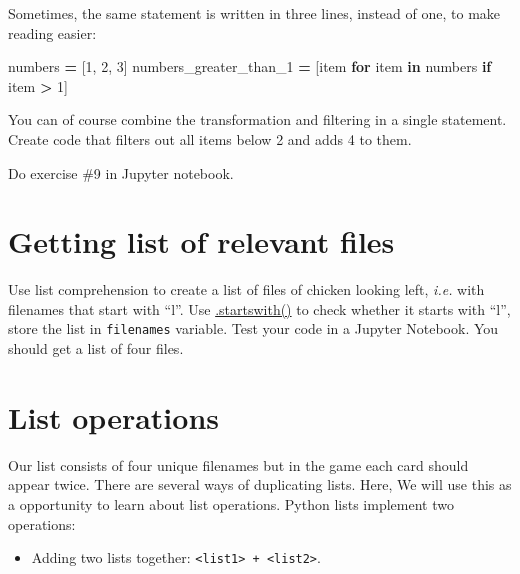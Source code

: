 \documentclass[
]{book}
\newenvironment{Shaded}{\begin{snugshade}}{\end{snugshade}}
\newcommand{\ControlFlowTok}[1]{\textcolor[rgb]{0.13,0.29,0.53}{\textbf{#1}}}
\newcommand{\DecValTok}[1]{\textcolor[rgb]{0.00,0.00,0.81}{#1}}
\newcommand{\KeywordTok}[1]{\textcolor[rgb]{0.13,0.29,0.53}{\textbf{#1}}}
\newcommand{\NormalTok}[1]{#1}
\newcommand{\OperatorTok}[1]{\textcolor[rgb]{0.81,0.36,0.00}{\textbf{#1}}}
\providecommand{\tightlist}{%
  \setlength{\itemsep}{0pt}\setlength{\parskip}{0pt}}
\begin{document}
Sometimes, the same statement is written in three lines, instead of one, to make reading easier:

\begin{Shaded}
\begin{Highlighting}[]
\NormalTok{numbers }\OperatorTok{=}\NormalTok{ [}\DecValTok{1}\NormalTok{, }\DecValTok{2}\NormalTok{, }\DecValTok{3}\NormalTok{]}
\NormalTok{numbers\_greater\_than\_1 }\OperatorTok{=}\NormalTok{ [item }
                          \ControlFlowTok{for}\NormalTok{ item }\KeywordTok{in}\NormalTok{ numbers}
                          \ControlFlowTok{if}\NormalTok{ item }\OperatorTok{\textgreater{}} \DecValTok{1}\NormalTok{]}
\end{Highlighting}
\end{Shaded}

You can of course combine the transformation and filtering in a single statement. Create code that filters out all items below 2 and adds 4 to them.

Do exercise \#9 in Jupyter notebook.

\hypertarget{getting-list-of-relevant-files}{%
\section{Getting list of relevant files}\label{getting-list-of-relevant-files}}

Use list comprehension to create a list of files of chicken looking left, \emph{i.e.} with filenames that start with ``l''. Use \href{https://docs.python.org/3/library/stdtypes.html\#str.startswith}{.startswith()} to check whether it starts with ``l'', store the list in \texttt{filenames} variable. Test your code in a Jupyter Notebook. You should get a list of four files.

\hypertarget{list-operations}{%
\section{List operations}\label{list-operations}}

Our list consists of four unique filenames but in the game each card should appear twice. There are several ways of duplicating lists. Here, We will use this as a opportunity to learn about list operations. Python lists implement two operations:

\begin{itemize}
\tightlist
\item
  Adding two lists together: \texttt{\textless{}list1\textgreater{}\ +\ \textless{}list2\textgreater{}}.
\end{itemize}
\end{document}
